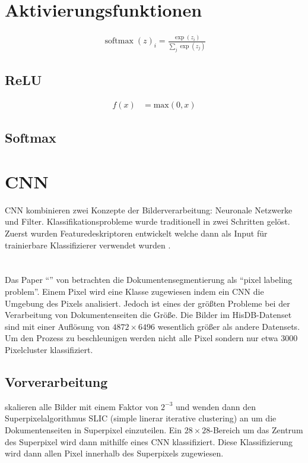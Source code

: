 \section{Aktivierungsfunktionen}
\begin{align}
    \operatorname{softmax}(z)_{i}=\frac{\exp\left(z_{i}\right)}{ \sum _ { j } \exp \left( z _ { j } \right) }
\end{align}

\subsection{ReLU}
\begin{align}
    f\left(x\right) &= \text{max}(0,x)
\end{align}
\subsection{Softmax}


\section{CNN}
CNN kombinieren zwei Konzepte der Bilderverarbeitung: Neuronale Netzwerke und Filter.
Klassifikationsprobleme wurde traditionell in zwei Schritten gelöst. Zuerst wurden 
Featuredeskriptoren entwickelt welche dann als Input für trainierbare Klassifizierer 
verwendet wurden \autocite[2353]{RawatDeepConvolutionalNeural2017}.

\qq{}

\section{\textcite{ChenConvolutionalNeuralNetworks2017}}
Das Paper ``'' von \citeauthor*{ChenConvolutionalNeuralNetworks2017} betrachten die Dokumentensegmentierung 
als ``pixel labeling problem''. Einem Pixel wird eine Klasse zugewiesen indem
ein CNN die Umgebung des Pixels analisiert. 
Jedoch ist eines der größten Probleme bei der Verarbeitung von Dokumentenseiten die Größe.
Die Bilder im HisDB-Datenset sind mit einer Auflösung von \(4872 \times 6496\) wesentlich größer als andere Datensets.
Um den Prozess zu beschleunigen werden nicht alle Pixel sondern nur etwa 3000 Pixelcluster klassifiziert. 

\subsection{Vorverarbeitung}
\citeauthor{ChenConvolutionalNeuralNetworks2017} skalieren alle Bilder mit einem Faktor von  \(2^{-3}\) und wenden dann den Superpixelalgorithmus SLIC (simple linerar iterative clustering) an \parencite{AchantaSLICSuperpixels2010} um die Dokumentenseiten in Superpixel einzuteilen.
Ein \(28 \times 28\)-Bereich um das Zentrum des Superpixel wird dann mithilfe eines CNN
klassifiziert. Diese Klassifizierung wird dann allen Pixel innerhalb des Superpixels zugewiesen.

